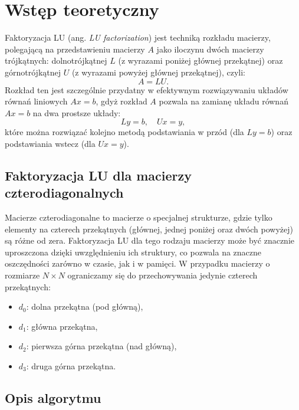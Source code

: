 \documentclass[a4paper,12pt]{article}
\begin{document}
\section{Wstęp teoretyczny}

Faktoryzacja LU (ang. \textit{LU factorization}) jest techniką rozkładu macierzy, polegającą na przedstawieniu macierzy $A$ jako iloczynu dwóch macierzy trójkątnych: dolnotrójkątnej $L$ (z wyrazami poniżej głównej przekątnej) oraz górnotrójkątnej $U$ (z wyrazami powyżej głównej przekątnej), czyli:
\[
A = LU.
\]
Rozkład ten jest szczególnie przydatny w efektywnym rozwiązywaniu układów równań liniowych $Ax = b$, gdyż rozkład $A$ pozwala na zamianę układu równań $Ax = b$ na dwa prostsze układy:
\[
Ly = b, \quad Ux = y,
\]
które można rozwiązać kolejno metodą podstawiania w przód (dla $Ly = b$) oraz podstawiania wstecz (dla $Ux = y$).

\subsection{Faktoryzacja LU dla macierzy czterodiagonalnych}

Macierze czterodiagonalne to macierze o specjalnej strukturze, gdzie tylko elementy na czterech przekątnych (głównej, jednej poniżej oraz dwóch powyżej) są różne od zera. Faktoryzacja LU dla tego rodzaju macierzy może być znacznie uproszczona dzięki uwzględnieniu ich struktury, co pozwala na znaczne oszczędności zarówno w czasie, jak i w pamięci. W przypadku macierzy o rozmiarze $N \times N$ ograniczamy się do przechowywania jedynie czterech przekątnych:
\begin{itemize}
    \item $d_0$: dolna przekątna (pod główną),
    \item $d_1$: główna przekątna,
    \item $d_2$: pierwsza górna przekątna (nad główną),
    \item $d_3$: druga górna przekątna.
\end{itemize}

\subsection{Opis algorytmu}
\end{document}
